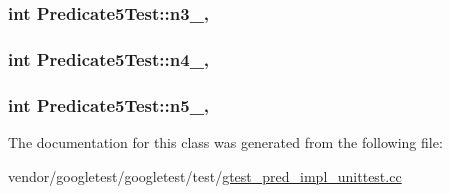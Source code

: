 \subsubsection[{\texorpdfstring{n3\+\_\+}{n3_}}]{\setlength{\rightskip}{0pt plus 5cm}int Predicate5\+Test\+::n3\+\_\+\hspace{0.3cm}{\ttfamily [static]}, {\ttfamily [protected]}}\hypertarget{classPredicate5Test_a63723efb915dbf418c31b97b64dabc0e}{}\label{classPredicate5Test_a63723efb915dbf418c31b97b64dabc0e}
\subsubsection[{\texorpdfstring{n4\+\_\+}{n4_}}]{\setlength{\rightskip}{0pt plus 5cm}int Predicate5\+Test\+::n4\+\_\+\hspace{0.3cm}{\ttfamily [static]}, {\ttfamily [protected]}}\hypertarget{classPredicate5Test_a5d66aa58badddc8d3d8070a93c0558d6}{}\label{classPredicate5Test_a5d66aa58badddc8d3d8070a93c0558d6}
\subsubsection[{\texorpdfstring{n5\+\_\+}{n5_}}]{\setlength{\rightskip}{0pt plus 5cm}int Predicate5\+Test\+::n5\+\_\+\hspace{0.3cm}{\ttfamily [static]}, {\ttfamily [protected]}}\hypertarget{classPredicate5Test_a96badba6366235a2771b27ea014bd9ce}{}\label{classPredicate5Test_a96badba6366235a2771b27ea014bd9ce}


The documentation for this class was generated from the following file\+:\begin{DoxyCompactItemize}
\item 
vendor/googletest/googletest/test/\hyperlink{gtest__pred__impl__unittest_8cc}{gtest\+\_\+pred\+\_\+impl\+\_\+unittest.\+cc}\end{DoxyCompactItemize}
